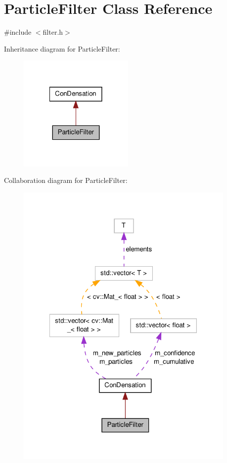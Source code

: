 \hypertarget{classParticleFilter}{\section{Particle\-Filter Class Reference}
\label{classParticleFilter}
}


{\ttfamily \#include $<$filter.\-h$>$}



Inheritance diagram for Particle\-Filter\-:\nopagebreak
\begin{figure}[H]
\begin{center}
\leavevmode
\includegraphics[width=158pt]{classParticleFilter__inherit__graph}
\end{center}
\end{figure}


Collaboration diagram for Particle\-Filter\-:\nopagebreak
\begin{figure}[H]
\begin{center}
\leavevmode
\includegraphics[width=302pt]{classParticleFilter__coll__graph}
\end{center}
\end{figure}
